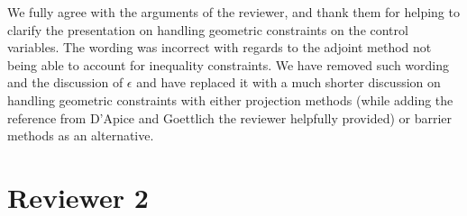 \documentclass[10pt]{article}
\begin{document}
We fully agree with the arguments of the reviewer, and thank them for helping to clarify the presentation on handling geometric constraints on the control variables. The wording was incorrect with regards to the adjoint method not being able to account for inequality constraints. We have removed such wording and the discussion of $\epsilon$ and have replaced it with a much shorter discussion on handling geometric constraints with either projection methods (while adding the reference from D'Apice and Goettlich the reviewer helpfully provided) or barrier methods as an alternative.\\


\section*{Reviewer 2}
\end{document}
